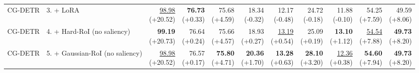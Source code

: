 \documentclass{article}
\begin{document}
{\begin{tabular}{llrrrrrrrrr}
CG-DETR & 3. + LoRA & \shortstack{\underline{98.98} \\ {\scriptsize (+20.52)}} & \shortstack{\textbf{76.73} \\ {\scriptsize (+0.33)}} & \shortstack{75.68 \\ {\scriptsize (+4.59)}} & \shortstack{18.34 \\ {\scriptsize (-0.32)}} & \shortstack{12.17 \\ {\scriptsize (-0.48)}} & \shortstack{24.72 \\ {\scriptsize (-0.18)}} & \shortstack{11.88 \\ {\scriptsize (-0.10)}} & \shortstack{54.25 \\ {\scriptsize (+7.59)}} & \shortstack{49.59 \\ {\scriptsize (+8.06)}} \\
CG-DETR & 4. + Hard-RoI (no saliency) & \shortstack{\textbf{99.19} \\ {\scriptsize (+20.73)}} & \shortstack{76.64 \\ {\scriptsize (+0.24)}} & \shortstack{75.66 \\ {\scriptsize (+4.57)}} & \shortstack{18.93 \\ {\scriptsize (+0.27)}} & \shortstack{\underline{13.19} \\ {\scriptsize (+0.54)}} & \shortstack{25.09 \\ {\scriptsize (+0.19)}} & \shortstack{\textbf{13.10} \\ {\scriptsize (+1.12)}} & \shortstack{\underline{54.54} \\ {\scriptsize (+7.88)}} & \shortstack{\textbf{49.73} \\ {\scriptsize (+8.20)}} \\
CG-DETR & 5. + Gaussian-RoI (no saliency) & \shortstack{\underline{98.98} \\ {\scriptsize (+20.52)}} & \shortstack{76.57 \\ {\scriptsize (+0.17)}} & \shortstack{\textbf{75.80} \\ {\scriptsize (+4.71)}} & \shortstack{\textbf{20.36} \\ {\scriptsize (+1.70)}} & \shortstack{\textbf{13.28} \\ {\scriptsize (+0.63)}} & \shortstack{\textbf{28.10} \\ {\scriptsize (+3.20)}} & \shortstack{\underline{12.36} \\ {\scriptsize (+0.38)}} & \shortstack{\textbf{54.60} \\ {\scriptsize (+7.94)}} & \shortstack{\textbf{49.73} \\ {\scriptsize (+8.20)}} \\

\end{tabular}}
\end{document}
